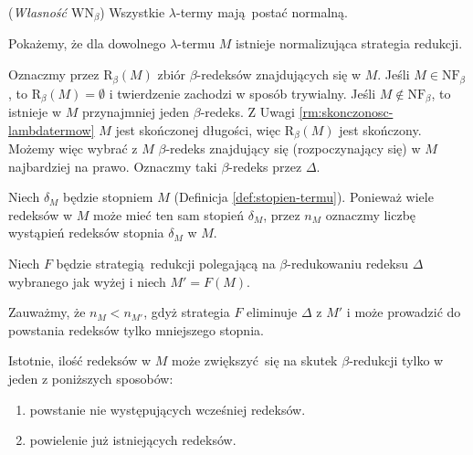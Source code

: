 \begin{twierdzenie}(\emph{Własność \(\mathrm{WN}_{\beta}\)}) Wszystkie \(\lambda\)-termy mają postać normalną.
\end{twierdzenie}
\begin{dowod}
  Pokażemy, że dla dowolnego \(\lambda\)-termu \(M\) istnieje normalizująca strategia redukcji. 

  Oznaczmy przez \(\mathrm{R}_\beta(M)\) zbiór \(\beta\)-redeksów znajdujących się w \(M\). Jeśli \(M\in \mathrm{NF}_\beta\), to \(\mathrm{R}_\beta(M)=\emptyset\) i twierdzenie zachodzi w sposób trywialny. Jeśli \(M\not\in \mathrm{NF}_\beta\), to istnieje w \(M\) przynajmniej jeden \(\beta\)-redeks. Z Uwagi \ref{rm:skonczonosc-lambdatermow} \(M\) jest skończonej długości, więc \(\mathrm{R}_\beta(M)\) jest skończony. Możemy więc wybrać z \(M\) \(\beta\)-redeks znajdujący się (rozpoczynający się) w \(M\) najbardziej na prawo. Oznaczmy taki \(\beta\)-redeks przez \(\Delta\). 

  Niech \(\delta_M\) będzie stopniem \(M\) (Definicja \ref{def:stopien-termu}). Ponieważ wiele redeksów w \(M\) może mieć ten sam stopień \(\delta_M\), przez \(n_M\) oznaczmy liczbę wystąpień redeksów stopnia \(\delta_M\) w \(M\). 

  Niech \(F\) będzie strategią redukcji polegającą na \(\beta\)-redukowaniu redeksu \(\Delta\) wybranego jak wyżej i niech \(M'=F(M)\).

  Zauważmy, że \(n_M < n_{M'}\), gdyż strategia \(F\) eliminuje \(\Delta\) z \(M'\) i może prowadzić do powstania redeksów tylko mniejszego stopnia.
  
  Istotnie, ilość redeksów w \(M\) może zwiększyć się na skutek \(\beta\)-redukcji tylko w jeden z poniższych sposobów: 
  \begin{enumerate}[label=\roman*)]
    \item powstanie nie występujących wcześniej redeksów.
    \item powielenie już istniejących redeksów.
  \end{enumerate}



\end{dowod}
